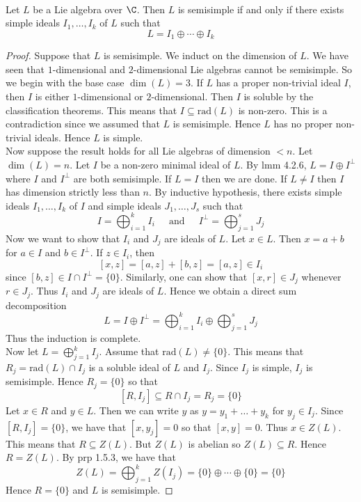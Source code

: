 \documentclass[a4paper]{article}
\begin{document}
\begin{thm}{}{} \\Let $L$ be a Lie algebra over $\C$. Then $L$ is semisimple if and only if there exists simple ideals $I_1,\dots,I_k$ of $L$ such that $$L=I_1\oplus\cdots\oplus I_k$$ 
\begin{proof}
Suppose that $L$ is semisimple. We induct on the dimension of $L$. We have seen that $1$-dimensional and $2$-dimensional Lie algebras cannot be semisimple. So we begin with the base case $\dim(L)=3$. If $L$ has a proper non-trivial ideal $I$, then $I$ is either $1$-dimensional or $2$-dimensional. Then $I$ is soluble by the classification theorems. This means that $I\subseteq\text{rad}(L)$ is non-zero. This is a contradiction since we assumed that $L$ is semisimple. Hence $L$ has no proper non-trivial ideals. Hence $L$ is simple. \\

Now suppose the result holds for all Lie algebras of dimension $<n$. Let $\dim(L)=n$. Let $I$ be a non-zero minimal ideal of $L$. By lmm 4.2.6, $L=I\oplus I^\perp$ where $I$ and $I^\perp$ are both semisimple. If $L=I$ then we are done. If $L\neq I$ then $I$ has dimension strictly less than $n$. By inductive hypothesis, there exists simple ideals $I_1,\dots,I_k$ of $I$ and simple ideals $J_1,\dots,J_s$ such that $$I=\bigoplus_{i=1}^k I_i\;\;\;\;\text{ and }\;\;\;\;I^\perp=\bigoplus_{j=1}^sJ_j$$ Now we want to show that $I_i$ and $J_j$ are ideals of $L$. Let $x\in L$. Then $x=a+b$ for $a\in I$ and $b\in I^\perp$. If $z\in I_i$, then $$[x,z]=[a,z]+[b,z]=[a,z]\in I_i$$ since $[b,z]\in I\cap I^\perp=\{0\}$. Similarly, one can show that $[x,r]\in J_j$ whenever $r\in J_j$. Thus $I_i$ and $J_j$ are ideals of $L$. Hence we obtain a direct sum decomposition $$L=I\oplus I^\perp=\bigoplus_{i=1}^kI_i\oplus\bigoplus_{j=1}^sJ_j$$ Thus the induction is complete. \\

Now let $L=\bigoplus_{j=1}^kI_j$. Assume that $\text{rad}(L)\neq\{0\}$. This means that $R_j=\text{rad}(L)\cap I_j$ is a soluble ideal of $L$ and $I_j$. Since $I_j$ is simple, $I_j$ is semisimple. Hence $R_j=\{0\}$ so that $$[R,I_j]\subseteq R\cap I_j=R_j=\{0\}$$ Let $x\in R$ and $y\in L$. Then we can write $y$ as $y=y_1+\dots+y_k$ for $y_j\in I_j$. Since $[R,I_j]=\{0\}$, we have that $[x,y_j]=0$ so that $[x,y]=0$. Thus $x\in Z(L)$. This means that $R\subseteq Z(L)$. But $Z(L)$ is abelian so $Z(L)\subseteq R$. Hence $R=Z(L)$. By prp 1.5.3, we have that $$Z(L)=\bigoplus_{j=1}^kZ(I_j)=\{0\}\oplus\cdots\oplus\{0\}=\{0\}$$ Hence $R=\{0\}$ and $L$ is semisimple. 
\end{proof}
\end{thm}
\end{document}
